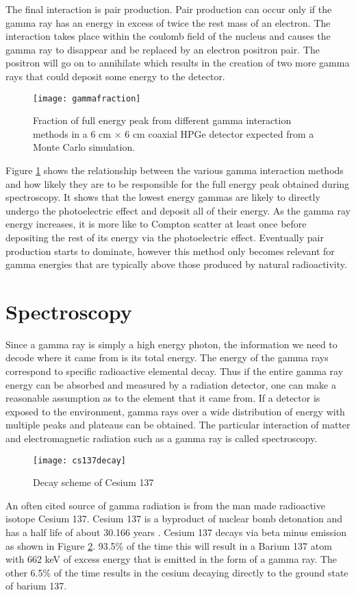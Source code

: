 The final interaction is pair production.
Pair production can occur only if the gamma ray has an energy in excess of twice the rest mass of an electron.
The interaction takes place within the coulomb field of the nucleus and causes the gamma ray to disappear and be replaced by an electron positron pair.
The positron will go on to annihilate which results in the creation of two more gamma rays that could deposit some energy to the detector.
\begin{figure}[htpb]
\centering
\texttt{[image: gammafraction]}
  \caption{Fraction of full energy peak from different gamma interaction methods in a 6 cm $\times$ 6 cm coaxial HPGe detector expected from a Monte Carlo simulation. \cite{Roth1984SegmentationAP}}
\label{fig:gammafraction}
\end{figure}
Figure \ref{fig:gammafraction} shows the relationship between the various gamma interaction methods and how likely they are to be responsible for the full energy peak obtained during spectroscopy.
It shows that the lowest energy gammas are likely to directly undergo the photoelectric effect and deposit all of their energy.
As the gamma ray energy increases, it is more like to Compton scatter at least once before depositing the rest of its energy via the photoelectric effect.
Eventually pair production starts to dominate, however this method only becomes relevant for gamma energies that are typically above those produced by natural radioactivity.

\section{Spectroscopy}
Since a gamma ray is simply a high energy photon, the information we need to decode where it came from is its total energy.
The energy of the gamma rays correspond to specific radioactive elemental decay.
Thus if the entire gamma ray energy can be absorbed and measured by a radiation detector, one can make a reasonable assumption as to the element that it came from.
If a detector is exposed to the environment, gamma rays over a wide distribution of energy with multiple peaks and plateaus can be obtained.
The particular interaction of matter and electromagnetic radiation such as a gamma ray is called spectroscopy.

\begin{figure}[htpb]
\centering
\texttt{[image: cs137decay]}
\caption{Decay scheme of Cesium 137}
\label{fig:cs137decay}
\end{figure}
An often cited source of gamma radiation is from the man made radioactive isotope Cesium 137.
Cesium 137 is a byproduct of nuclear bomb detonation and has a half life of about 30.166 years \cite{1992NIMPA}.
Cesium 137 decays via beta minus emission as shown in Figure \ref{fig:cs137decay}.
93.5\% of the time this will result in a Barium 137 atom with 662 keV of excess energy that is emitted in the form of a gamma ray.
The other 6.5\% of the time results in the cesium decaying directly to the ground state of barium 137.

